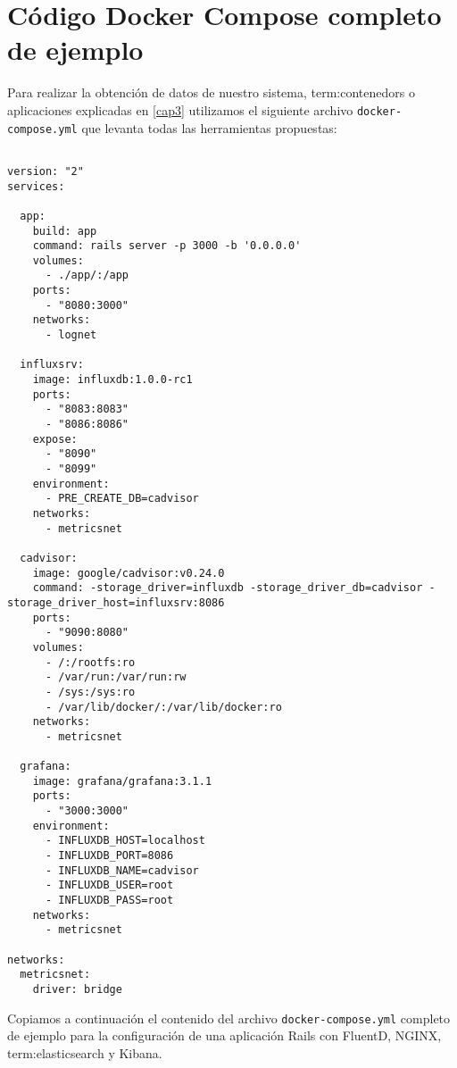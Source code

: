 \section{Código Docker Compose completo de ejemplo}
\label{anexo:C}

Para realizar la obtención de datos de nuestro sistema, \glspl{term:contenedor} o
aplicaciones explicadas en \autoref{cap3} utilizamos el siguiente archivo
\texttt{docker-compose.yml} que levanta todas las herramientas propuestas:

\begin{lstlisting}

version: "2"
services:

  app:
    build: app
    command: rails server -p 3000 -b '0.0.0.0'
    volumes:
      - ./app/:/app
    ports:
      - "8080:3000"
    networks:
      - lognet

  influxsrv:
    image: influxdb:1.0.0-rc1
    ports:
      - "8083:8083"
      - "8086:8086"
    expose:
      - "8090"
      - "8099"
    environment:
      - PRE_CREATE_DB=cadvisor
    networks:
      - metricsnet

  cadvisor:
    image: google/cadvisor:v0.24.0
    command: -storage_driver=influxdb -storage_driver_db=cadvisor -storage_driver_host=influxsrv:8086
    ports:
      - "9090:8080"
    volumes:
      - /:/rootfs:ro
      - /var/run:/var/run:rw
      - /sys:/sys:ro
      - /var/lib/docker/:/var/lib/docker:ro
    networks:
      - metricsnet

  grafana:
    image: grafana/grafana:3.1.1
    ports:
      - "3000:3000"
    environment:
      - INFLUXDB_HOST=localhost
      - INFLUXDB_PORT=8086
      - INFLUXDB_NAME=cadvisor
      - INFLUXDB_USER=root
      - INFLUXDB_PASS=root
    networks:
      - metricsnet

networks:
  metricsnet:
    driver: bridge

\end{lstlisting}

Copiamos a continuación el contenido del archivo \texttt{docker-compose.yml}
completo de ejemplo para la configuración de una aplicación Rails con FluentD,
NGINX, \gls{term:elasticsearch} y Kibana.

